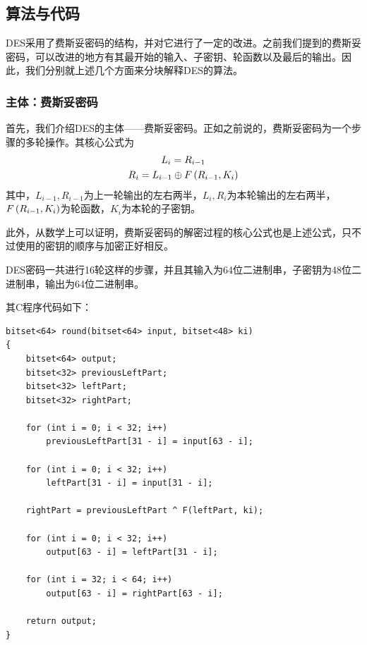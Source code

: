 \subsection{算法与代码}
DES采用了费斯妥密码的结构，并对它进行了一定的改进。之前我们提到的费斯妥密码，可以改进的地方有其最开始的输入、子密钥、轮函数以及最后的输出。因此，我们分别就上述几个方面来分块解释DES的算法。
\subsubsection{主体：费斯妥密码}
首先，我们介绍DES的主体——费斯妥密码。正如之前说的，费斯妥密码为一个步骤的多轮操作。其核心公式为
\begin{gather}
    L_{i}=R_{i-1}\\
    R_{i}=L_{i-1}\oplus F\left( {R_{i-1}, K_i}\right)
\end{gather}
其中，$L_{i-1}, R_{i-1}$为上一轮输出的左右两半，$L_i, R_i$为本轮输出的左右两半，$F\left( {R_{i-1}, K_i}\right)$为轮函数，$K_i$为本轮的子密钥。\par
此外，从数学上可以证明，费斯妥密码的解密过程的核心公式也是上述公式，只不过使用的密钥的顺序与加密正好相反。\par
DES密码一共进行16轮这样的步骤，并且其输入为64位二进制串，子密钥为48位二进制串，输出为64位二进制串。\par
其C程序代码如下：
\begin{prove}
\begin{verbatim}
bitset<64> round(bitset<64> input, bitset<48> ki)
{
    bitset<64> output;
    bitset<32> previousLeftPart;
    bitset<32> leftPart;
    bitset<32> rightPart;
    
    for (int i = 0; i < 32; i++)
        previousLeftPart[31 - i] = input[63 - i];
    
    for (int i = 0; i < 32; i++)
        leftPart[31 - i] = input[31 - i];
    
    rightPart = previousLeftPart ^ F(leftPart, ki);
    
    for (int i = 0; i < 32; i++)
        output[63 - i] = leftPart[31 - i];
    
    for (int i = 32; i < 64; i++)
        output[63 - i] = rightPart[63 - i];

    return output;
}
\end{verbatim}
\end{prove}
